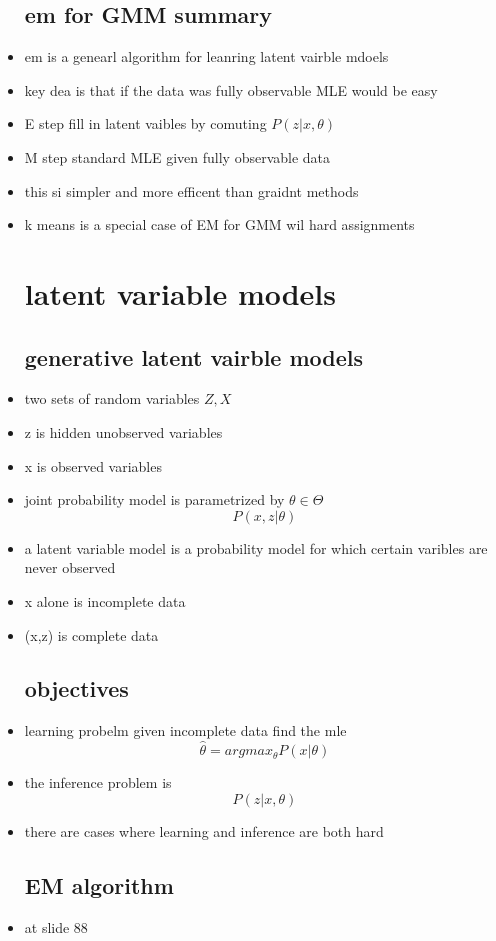 \documentclass{article}
\begin{document}
\begin{itemize}
\subsection*{em for GMM summary}
\item em is a genearl algorithm for leanring latent vairble mdoels 
\item key dea is that if the data was fully observable MLE would be easy 
\item E step fill in latent vaibles by comuting $P(z|x,\theta)$
\item M step standard MLE given fully observable data 
\item this si simpler and more efficent than graidnt methods 
\item k means is a special case of EM for GMM wil hard assignments
\section*{latent variable models}
\subsection*{generative latent vairble models}
\item two sets of random variables $Z, X$
\item z is hidden unobserved variables
\item x is observed variables
\item joint probability model is parametrized by $\theta\in \Theta$ $$P(x,z|\theta)$$
\item a latent variable model is a probability model for which certain varibles are never observed 
\item x alone is incomplete data 
\item (x,z) is complete data
\subsection*{objectives}
\item learning probelm given incomplete data find the mle $$\hat{\theta}=argmax_{\theta}P(x|\theta)$$
\item the inference problem is $$P(z|x,\theta)$$
\item there are cases where learning and inference are both hard 
\subsection*{EM algorithm}
\item at slide 88




















\end{itemize}
\end{document}
